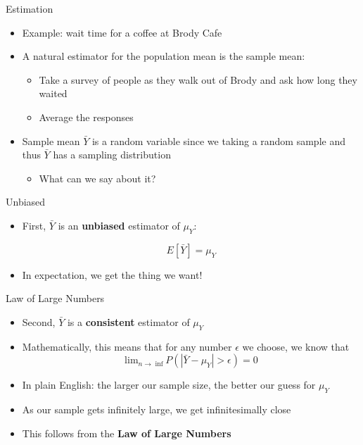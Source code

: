 \documentclass[aspectratio=169]{beamer}
\begin{document}
\begin{frame}{Estimation}
    \begin{itemize}
        \item Example: wait time for a coffee at Brody Cafe
        \item A natural estimator for the population mean is the sample mean:
        \begin{itemize}
            \item Take a survey of people as they walk out of Brody and ask how long they waited
            \item Average the responses
        \end{itemize}
        \item Sample mean $\bar{Y}$ is a random variable since we taking a random sample and thus $\bar{Y}$ has a sampling distribution
        \begin{itemize}
            \item What can we say about it?
        \end{itemize}
    \end{itemize}
\end{frame}

\begin{frame}{Unbiased}
    \begin{itemize}
        \item First, $\bar{Y}$ is an \textbf{unbiased} estimator of $\mu_Y$:
        
        $$
        E[\bar{Y}] = \mu_Y
        $$

        \item In expectation, we get the thing we want!
    \end{itemize}
\end{frame}

\begin{frame}{Law of Large Numbers}
    \begin{itemize}
        \item Second, $\bar{Y}$ is a \textbf{consistent} estimator of $\mu_Y$
        \item Mathematically, this means that for any number $\epsilon$ we choose, we know that
        $$
            \text{lim}_{n \to \inf} P(|\bar{Y} - \mu_Y| > \epsilon) = 0
        $$
        \item In plain English: the larger our sample size, the better our guess for $\mu_Y$
        \item As our sample gets infinitely large, we get infinitesimally close
        \item This follows from the \textbf{Law of Large Numbers}
    \end{itemize}
\end{frame}
\end{document}
